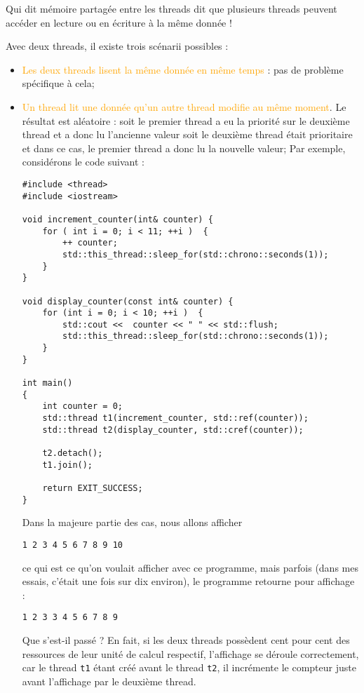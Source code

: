 \documentclass[fleqn,11pt]{article}
\begin{document}
Qui dit mémoire partagée entre les threads dit que plusieurs threads peuvent accéder
en lecture ou en écriture à la même donnée !

Avec deux threads, il existe trois scénarii possibles :
\begin{itemize}
\item \textcolor{orange}{Les deux threads lisent la même donnée en même temps} : pas de problème spécifique
à cela;
\item \textcolor{orange}{Un thread lit une donnée qu'un autre thread modifie au même moment}.  Le résultat est aléatoire :
soit le premier thread a eu la priorité sur le deuxième thread et a donc lu l'ancienne valeur soit
le deuxième thread était prioritaire et dans ce cas, le premier thread a donc lu la nouvelle valeur;
Par exemple, considérons le code suivant :
\begin{lstlisting}
#include <thread>
#include <iostream>

void increment_counter(int& counter) {
    for ( int i = 0; i < 11; ++i )  {
        ++ counter;
        std::this_thread::sleep_for(std::chrono::seconds(1));
    }
}

void display_counter(const int& counter) {
    for (int i = 0; i < 10; ++i )  {
        std::cout <<  counter << " " << std::flush;
        std::this_thread::sleep_for(std::chrono::seconds(1));        
    }
}

int main()
{
    int counter = 0;
    std::thread t1(increment_counter, std::ref(counter));
    std::thread t2(display_counter, std::cref(counter));

    t2.detach();
    t1.join();

    return EXIT_SUCCESS;
}
\end{lstlisting}
Dans la majeure partie des cas, nous allons afficher 
\begin{verbatim}
1 2 3 4 5 6 7 8 9 10
\end{verbatim}
ce qui est ce qu'on voulait afficher avec ce programme,
mais parfois (dans mes essais, c'était une fois sur dix environ), le programme retourne pour affichage :
\begin{verbatim}
1 2 3 3 4 5 6 7 8 9
\end{verbatim}

Que s'est-il passé ? En fait, si les deux threads possèdent cent pour cent des ressources de leur unité de calcul respectif, l'affichage se déroule correctement, car le thread \texttt{t1} étant créé avant le thread
\texttt{t2}, il incrémente le compteur juste avant l'affichage par le deuxième thread.


\end{itemize}
\end{document}
